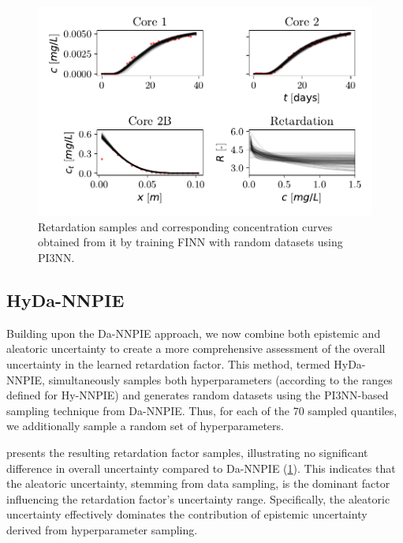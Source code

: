 \begin{figure}[h]
    \centering
    \includegraphics{figs/finn_dataspan_samples.pdf}
    \caption{Retardation samples and corresponding concentration curves obtained from it by training FINN with random datasets using PI3NN.}
    \label{fig:dataspan_samples}
\end{figure}



\subsection{HyDa-NNPIE}
Building upon the Da-NNPIE approach, we now combine both epistemic and aleatoric uncertainty to create a more comprehensive assessment of the overall uncertainty in the learned retardation factor. This method, termed HyDa-NNPIE, simultaneously samples both hyperparameters (according to the ranges defined for Hy-NNPIE) and generates random datasets using the PI3NN-based sampling technique from Da-NNPIE. Thus, for each of the 70 sampled quantiles, we additionally sample a random set of hyperparameters.

 presents the resulting retardation factor samples, illustrating no significant difference in overall uncertainty compared to Da-NNPIE (\cref{fig:dataspan_samples}). This indicates that the aleatoric uncertainty, stemming from data sampling, is the dominant factor influencing the retardation factor's uncertainty range. Specifically, the aleatoric uncertainty effectively dominates the contribution of epistemic uncertainty derived from hyperparameter sampling.

